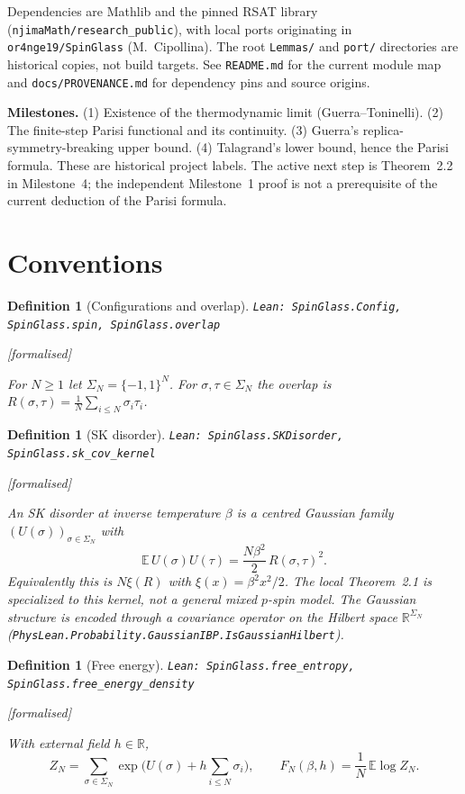 \documentclass[11pt]{article}
\providecommand{\lean}[1]{\leavevmode\par\nopagebreak
  {\noindent\normalfont\footnotesize\raggedright\texttt{Lean: #1}\par}\nopagebreak}
\providecommand{\leanok}{\par\nopagebreak
  {\noindent\normalfont\footnotesize\textcolor{green!50!black}{[formalised]}\par}\nopagebreak}
\newtheorem{definition}[theorem]{Definition}
\newcommand{\E}{\mathbb{E}}
\newcommand{\R}{\mathbb{R}}
\newcommand{\Sig}{\Sigma_N}
\begin{document}
Dependencies are Mathlib and the pinned RSAT library
(\texttt{njimaMath/research\_public}), with local ports originating in
\texttt{or4nge19/SpinGlass} (M.~Cipollina). The root \texttt{Lemmas/} and
\texttt{port/} directories are historical copies, not build targets.
See \texttt{README.md} for the current module map and \texttt{docs/PROVENANCE.md}
for dependency pins and source origins.

\textbf{Milestones.} (1) Existence of the thermodynamic limit (Guerra--Toninelli).
(2) The finite-step Parisi functional and its continuity.
(3) Guerra's replica-symmetry-breaking upper bound.
(4) Talagrand's lower bound, hence the Parisi formula.
These are historical project labels. The active next step is Theorem~2.2 in
Milestone~4; the independent Milestone~1 proof is not a prerequisite of the current
deduction of the Parisi formula.

\section{Conventions}

\begin{definition}[Configurations and overlap]
\lean{SpinGlass.Config, SpinGlass.spin, SpinGlass.overlap}\leanok
For $N\ge1$ let $\Sig=\{-1,1\}^N$. For $\sigma,\tau\in\Sig$ the overlap is
$R(\sigma,\tau)=\frac1N\sum_{i\le N}\sigma_i\tau_i$.
\end{definition}

\begin{definition}[SK disorder]
\lean{SpinGlass.SKDisorder, SpinGlass.sk\_cov\_kernel}\leanok
An SK disorder at inverse temperature $\beta$ is a centred Gaussian family
$(U(\sigma))_{\sigma\in\Sig}$ with
\[
\E\,U(\sigma)U(\tau)=\frac{N\beta^2}{2}\,R(\sigma,\tau)^2 .
\]
Equivalently this is $N\xi(R)$ with $\xi(x)=\beta^2x^2/2$.
The local Theorem~2.1 is specialized to this kernel, not a general mixed $p$-spin model.
The Gaussian structure is encoded through a covariance operator on the Hilbert space
$\R^{\Sig}$ (\texttt{PhysLean.Probability.GaussianIBP.IsGaussianHilbert}).
\end{definition}

\begin{definition}[Free energy]
\lean{SpinGlass.free\_entropy, SpinGlass.free\_energy\_density}\leanok
With external field $h\in\R$,
\[
Z_N=\sum_{\sigma\in\Sig}\exp\Big(U(\sigma)+h\sum_{i\le N}\sigma_i\Big),
\qquad
F_N(\beta,h)=\frac1N\,\E\log Z_N .
\]
\end{definition}
\end{document}
